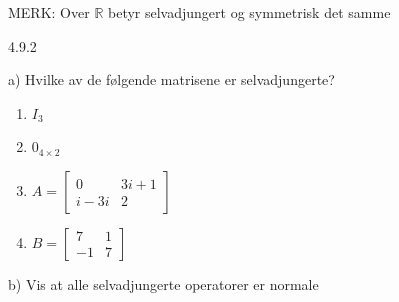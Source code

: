 \documentclass[a4paper,norsk]{article}
\begin{document}
MERK: Over $ \mathbb{R} $ betyr selvadjungert og symmetrisk det samme


\begin{oppgavebox}{4.9.2}{}

a) Hvilke av de følgende matrisene er selvadjungerte?
\begin{enumerate}
    \item $ I_3 $
    \item $ 0_{4 \times 2} $  
    \item $ A = \begin{bmatrix}
        0&3i+1\\ i-3i& 2
    \end{bmatrix}  $ 
    \item $ B = \begin{bmatrix}
        7&1 \\ -1&7
    \end{bmatrix}  $ 
\end{enumerate}
b) Vis at alle selvadjungerte operatorer er normale


\end{oppgavebox}
\end{document}
